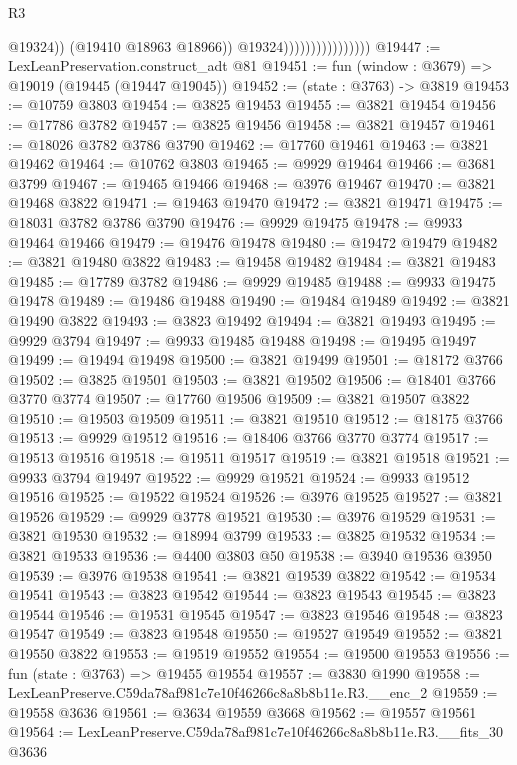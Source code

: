 \begin{lexlean}{R3}
\begin{coremodule}
                                          @19324))
                                      (@19410 @18963 @18966))
                                    @19324))))))))))))))))
@19447 := LexLeanPreservation.construct_adt @81
@19451 := fun (window : @3679) => @19019 (@19445 (@19447 @19045))
@19452 := (state : @3763) -> @3819
@19453 := @10759 @3803
@19454 := @3825 @19453
@19455 := @3821 @19454
@19456 := @17786 @3782
@19457 := @3825 @19456
@19458 := @3821 @19457
@19461 := @18026 @3782 @3786 @3790
@19462 := @17760 @19461
@19463 := @3821 @19462
@19464 := @10762 @3803
@19465 := @9929 @19464
@19466 := @3681 @3799
@19467 := @19465 @19466
@19468 := @3976 @19467
@19470 := @3821 @19468 @3822
@19471 := @19463 @19470
@19472 := @3821 @19471
@19475 := @18031 @3782 @3786 @3790
@19476 := @9929 @19475
@19478 := @9933 @19464 @19466
@19479 := @19476 @19478
@19480 := @19472 @19479
@19482 := @3821 @19480 @3822
@19483 := @19458 @19482
@19484 := @3821 @19483
@19485 := @17789 @3782
@19486 := @9929 @19485
@19488 := @9933 @19475 @19478
@19489 := @19486 @19488
@19490 := @19484 @19489
@19492 := @3821 @19490 @3822
@19493 := @3823 @19492
@19494 := @3821 @19493
@19495 := @9929 @3794
@19497 := @9933 @19485 @19488
@19498 := @19495 @19497
@19499 := @19494 @19498
@19500 := @3821 @19499
@19501 := @18172 @3766
@19502 := @3825 @19501
@19503 := @3821 @19502
@19506 := @18401 @3766 @3770 @3774
@19507 := @17760 @19506
@19509 := @3821 @19507 @3822
@19510 := @19503 @19509
@19511 := @3821 @19510
@19512 := @18175 @3766
@19513 := @9929 @19512
@19516 := @18406 @3766 @3770 @3774
@19517 := @19513 @19516
@19518 := @19511 @19517
@19519 := @3821 @19518
@19521 := @9933 @3794 @19497
@19522 := @9929 @19521
@19524 := @9933 @19512 @19516
@19525 := @19522 @19524
@19526 := @3976 @19525
@19527 := @3821 @19526
@19529 := @9929 @3778 @19521
@19530 := @3976 @19529
@19531 := @3821 @19530
@19532 := @18994 @3799
@19533 := @3825 @19532
@19534 := @3821 @19533
@19536 := @4400 @3803 @50
@19538 := @3940 @19536 @3950
@19539 := @3976 @19538
@19541 := @3821 @19539 @3822
@19542 := @19534 @19541
@19543 := @3823 @19542
@19544 := @3823 @19543
@19545 := @3823 @19544
@19546 := @19531 @19545
@19547 := @3823 @19546
@19548 := @3823 @19547
@19549 := @3823 @19548
@19550 := @19527 @19549
@19552 := @3821 @19550 @3822
@19553 := @19519 @19552
@19554 := @19500 @19553
@19556 := fun (state : @3763) => @19455 @19554
@19557 := @3830 @1990
@19558 := LexLeanPreserve.C59da78af981c7e10f46266c8a8b8b11e.R3.__enc_2
@19559 := @19558 @3636
@19561 := @3634 @19559 @3668
@19562 := @19557 @19561
@19564 := LexLeanPreserve.C59da78af981c7e10f46266c8a8b8b11e.R3.__fits_30 @3636

\end{coremodule}
\end{lexlean}
